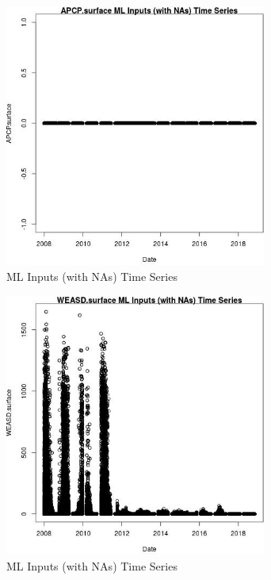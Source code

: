 \begin{figure} 
\centering  
\includegraphics[width=0.77\textwidth]{Code_Outputs/Report_ML_input_PM25_Step4_part_e_de_duplicated_aves_compiled_2019-05-20wNAs_APCPsurfacevDate.jpg} 
\caption{\label{fig:Report_ML_input_PM25_Step4_part_e_de_duplicated_aves_compiled_2019-05-20wNAsAPCPsurfacevDate}ML Inputs (with NAs) Time Series} 
\end{figure} 
 

\begin{figure} 
\centering  
\includegraphics[width=0.77\textwidth]{Code_Outputs/Report_ML_input_PM25_Step4_part_e_de_duplicated_aves_compiled_2019-05-20wNAs_WEASDsurfacevDate.jpg} 
\caption{\label{fig:Report_ML_input_PM25_Step4_part_e_de_duplicated_aves_compiled_2019-05-20wNAsWEASDsurfacevDate}ML Inputs (with NAs) Time Series} 
\end{figure} 
 

